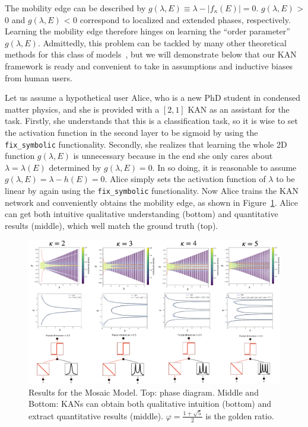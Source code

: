 \documentclass{article}
\numberwithin{equation}{section}
\numberwithin{figure}{section}
\begin{document}
The mobility edge can be described by $g(\lambda,E)\equiv\lambda-|f_\kappa(E)|=0$. $g(\lambda,E)$ > 0 and $g(\lambda,E)$ < 0 correspond to localized and extended phases, respectively. Learning the mobility edge therefore hinges on learning the ``order parameter'' $g(\lambda, E)$. Admittedly, this problem can be tackled by many other theoretical methods for this class of models~\cite{ME_wang2020one}, but we will demonstrate below that our KAN framework is ready and convenient to take in assumptions and inductive biases from human users.

Let us assume a hypothetical user Alice, who is a new PhD student in condensed matter physics, and she is provided with a $[2,1]$ KAN as an assistant for the task. Firstly, she understands that this is a classification task, so it is wise to set the activation function in the second layer to be sigmoid by using the \texttt{fix\_symbolic} functionality. Secondly, she realizes that learning the whole 2D function $g(\lambda,E)$ is unnecessary because in the end she only cares about $\lambda=\lambda(E)$ determined by $g(\lambda,E)=0$. In so doing, it is reasonable to assume $g(\lambda,E)=\lambda-h(E)=0$. Alice simply sets the activation function of $\lambda$ to be linear by again using the \texttt{fix\_symbolic} functionality. Now Alice trains the KAN network and conveniently obtains the mobility edge, as shown in Figure~\ref{fig:mosaic-results}. Alice can get both intuitive qualitative understanding (bottom) and quantitative results (middle), which well match the ground truth (top).


\begin{figure}[t]
    \centering
    \includegraphics[width=1\linewidth]{./figs/mosaic_results.png}
    \caption{Results for the Mosaic Model. Top: phase diagram. Middle and Bottom: KANs can obtain both qualitative intuition (bottom) and extract quantitative results (middle). $\varphi = \frac{1+\sqrt{5}}{2}$ is the golden ratio.}
    \label{fig:mosaic-results}
\end{figure}
\end{document}
